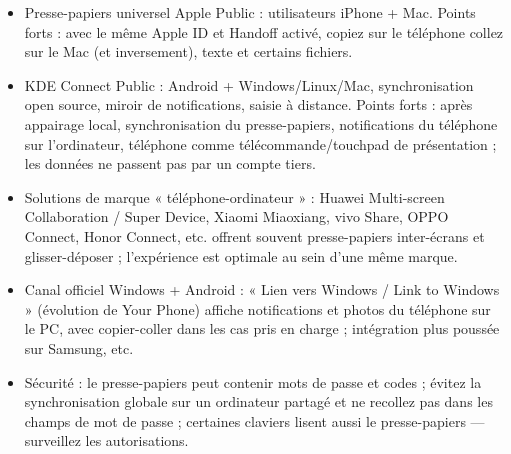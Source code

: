 
\begin{itemize}
  \item Presse-papiers universel Apple Public : utilisateurs iPhone + Mac. Points forts : avec le même Apple ID et Handoff activé, copiez sur le téléphone collez sur le Mac (et inversement), texte et certains fichiers.
  \item KDE Connect Public : Android + Windows/Linux/Mac, synchronisation open source, miroir de notifications, saisie à distance. Points forts : après appairage local, synchronisation du presse-papiers, notifications du téléphone sur l'ordinateur, téléphone comme télécommande/touchpad de présentation ; les données ne passent pas par un compte tiers.
  \item Solutions de marque « téléphone-ordinateur » : Huawei Multi-screen Collaboration / Super Device, Xiaomi Miaoxiang, vivo Share, OPPO Connect, Honor Connect, etc. offrent souvent presse-papiers inter-écrans et glisser-déposer ; l'expérience est optimale au sein d'une même marque.
  \item Canal officiel Windows + Android : « Lien vers Windows / Link to Windows » (évolution de Your Phone) affiche notifications et photos du téléphone sur le PC, avec copier-coller dans les cas pris en charge ; intégration plus poussée sur Samsung, etc.
  \item Sécurité : le presse-papiers peut contenir mots de passe et codes ; évitez la synchronisation globale sur un ordinateur partagé et ne recollez pas dans les champs de mot de passe ; certaines claviers lisent aussi le presse-papiers — surveillez les autorisations.
\end{itemize}


